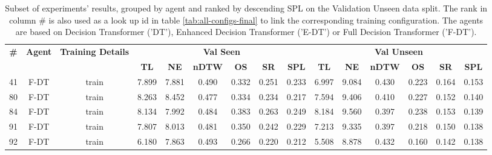 \begin{table}
\centering
\caption{\label{tab:full_dt_ablation}Subset of experiments' results, grouped by agent and ranked by descending SPL on the Validation Unseen data split. The rank in column \# is also used as a look up id in table \ref{tab:all-configs-final} to link the corresponding training configuration.     \newline The agents are based on Decision Transformer ('DT'), Enhanced Decision Transformer ('E-DT') or Full Decision Transformer ('F-DT').}
\begin{tabular}{@{\hskip3pt}c@{\hskip3pt}c@{\hskip3pt}c@{\hskip3pt}c@{\hskip3pt}c@{\hskip3pt}c@{\hskip3pt}c@{\hskip3pt}c@{\hskip3pt}c@{\hskip3pt}c@{\hskip3pt}c@{\hskip3pt}c@{\hskip3pt}c@{\hskip3pt}c@{\hskip3pt}c}
\toprule
\textbf{\#} & \textbf{Agent} & \textbf{Training Details} & \multicolumn{6}{c}{\textbf{Val Seen}} & \multicolumn{6}{c}{\textbf{Val Unseen}} \\
\cmidrule(l){4-9} \cmidrule(l){10-15} \textbf{~} &     \textbf{~} &                \textbf{~} &       \textbf{TL} & \textbf{NE} & \textbf{nDTW} & \textbf{OS} & \textbf{SR} & \textbf{SPL} &         \textbf{TL} & \textbf{NE} & \textbf{nDTW} & \textbf{OS} & \textbf{SR} & \textbf{SPL} \\
\midrule
         41 &           F-DT &                     train &             7.899 &       7.881 &         0.490 &       0.332 &       0.251 &        0.233 &               6.997 &       9.084 &         0.430 &       0.223 &       0.164 &        0.153 \\
         80 &           F-DT &                     train &             8.263 &       8.452 &         0.477 &       0.334 &       0.234 &        0.217 &               7.594 &       9.406 &         0.410 &       0.227 &       0.152 &        0.140 \\
         84 &           F-DT &                     train &             8.134 &       7.992 &         0.484 &       0.383 &       0.263 &        0.249 &               8.184 &       9.560 &         0.397 &       0.238 &       0.153 &        0.139 \\
         91 &           F-DT &                     train &             7.807 &       8.013 &         0.481 &       0.350 &       0.242 &        0.229 &               7.213 &       9.335 &         0.397 &       0.218 &       0.150 &        0.138 \\
         92 &           F-DT &                     train &             6.180 &       7.863 &         0.493 &       0.266 &       0.220 &        0.212 &               5.508 &       8.878 &         0.432 &       0.160 &       0.142 &        0.138 \\

\end{tabular}
\end{table}
